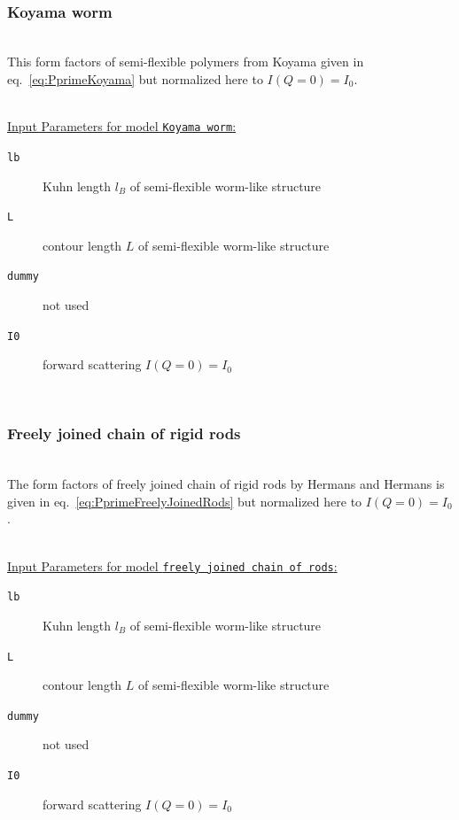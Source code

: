 \vphantom{.}~\\

\subsubsection{Koyama worm}
\label{sect:ffKoyamaWorm}
~\\
This form factors of semi-flexible polymers from Koyama \cite{Koyama1973,Koyama1974} given in eq.\ \ref{eq:PprimeKoyama} but normalized here to $I(Q=0)=I_0$.

\vspace{5mm}

\hspace{1pt}\\
\underline{Input Parameters for model \texttt{Koyama worm}:}\\
\begin{description}
\item[\texttt{lb}] Kuhn length $l_B$ of semi-flexible worm-like structure
\item[\texttt{L}] contour length $L$ of semi-flexible worm-like structure
\item[\texttt{dummy}] not used
\item[\texttt{I0}] forward scattering $I(Q=0)=I_0$
\end{description}

\vphantom{.}~\\

\subsubsection{Freely joined chain of rigid rods}
\label{sect:ffWormFreelyJoinedChainOfRods}
~\\
The form factors of freely joined chain of rigid rods by Hermans and Hermans \cite{Hermans1958} is given in eq.\ \ref{eq:PprimeFreelyJoinedRods} but normalized here to $I(Q=0)=I_0$.

\vspace{5mm}

\hspace{1pt}\\
\underline{Input Parameters for model \texttt{freely joined chain of rods}:}\\
\begin{description}
\item[\texttt{lb}] Kuhn length $l_B$ of semi-flexible worm-like structure
\item[\texttt{L}] contour length $L$ of semi-flexible worm-like structure
\item[\texttt{dummy}] not used
\item[\texttt{I0}] forward scattering $I(Q=0)=I_0$
\end{description}
